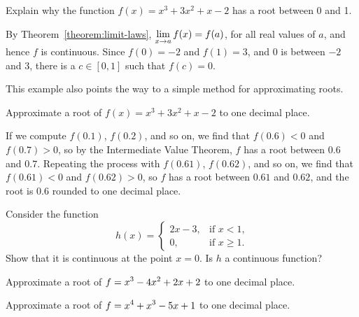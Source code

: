\begin{example} 
Explain why the function $f(x) =x^3 + 3x^2+x-2$ has a root between 0
and 1.
\end{example}

\begin{solution}
By Theorem~\ref{theorem:limit-laws}, $\displaystyle \lim_{x\to a} f(x) =
f(a)$, for all real values of $a$, and hence $f$ is continuous.  Since
$f(0)=-2$ and $f(1)=3$, and $0$ is between $-2$ and $3$, there is a
$c\in[0,1]$ such that $f(c)=0$.
\end{solution}

This example also points the way to a simple method for approximating
roots. 

\begin{example} 
Approximate a root of $f(x) =x^3 + 3x^2+x-2$ to one decimal place.
\end{example}
\begin{solution}
If we compute $f(0.1)$, $f(0.2)$, and so on, we find that $f(0.6)<0$
and $f(0.7)>0$, so by the Intermediate Value Theorem, $f$ has a root
between $0.6$ and $0.7$. Repeating the process with $f(0.61)$,
$f(0.62)$, and so on, we find that $f(0.61)<0$ and $f(0.62)>0$, so $f$
has a root between $0.61$ and $0.62$, and the root is $0.6$ rounded to
one decimal place.
\end{solution}





\begin{exercises}

 \begin{exercise} 
Consider the function
\[
h(x) = 
\begin{cases} 
2x - 3, & \text{if $x<1$,} \\ 
0,      & \text{if $x\geq 1$.}
\end{cases}
\]
Show that it is continuous at the point $x=0$.  Is $h$ a continuous function?
\end{exercise}

\begin{exercise}
Approximate a root of $\displaystyle f=x^3-4x^2+2x+2$ to one decimal place.
\end{exercise}

\begin{exercise}
Approximate a root of $\displaystyle f=x^4+x^3-5x+1$ to one decimal place.
\end{exercise}

\end{exercises}
